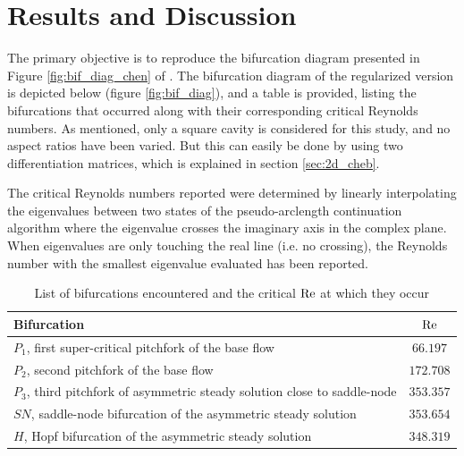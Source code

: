 
\section{Results and Discussion} \label{sec:resdisc}

The primary objective is to reproduce the bifurcation diagram presented in
Figure \ref{fig:bif_diag_chen} of \citet{chen2013}. The bifurcation diagram of
the regularized version is depicted below (figure \ref{fig:bif_diag}), and a
table is provided, listing the bifurcations that occurred along with their
corresponding critical Reynolds numbers. As mentioned, only a square cavity is
considered for this study, and no aspect ratios have been varied. But this can
easily be done by using two differentiation matrices, which is explained in
section \ref{sec:2d_cheb}.

The critical Reynolds numbers reported were determined by linearly
interpolating the eigenvalues between two states of the pseudo-arclength
continuation algorithm where the eigenvalue crosses the imaginary axis in the
complex plane. When eigenvalues are only touching the real line (i.e. no
crossing), the Reynolds number with the smallest eigenvalue evaluated has been
reported.

\begin{table}[h!]
  \centering
  \caption{List of bifurcations encountered and the critical $\mathrm{Re}$ at which they
    occur}
  \label{tab:bif_points}
\begin{tabular}{l c}
Bifurcation & $\mathrm{Re}$\\
\hline
$P_1$, first super-critical pitchfork of the base flow & $66.197$ \\
$P_2$, second pitchfork of the base flow & $172.708$ \\
$P_3$, third pitchfork of asymmetric steady solution close to saddle-node & $353.357$ \\
$SN$, saddle-node bifurcation of the asymmetric steady solution & $353.654$ \\
$H$, Hopf bifurcation of the asymmetric steady solution & $348.319$ \\
\end{tabular}
\end{table}

